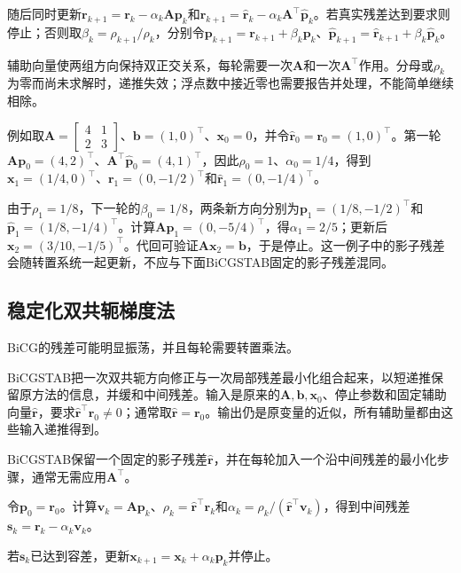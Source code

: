 随后同时更新$\bm r_{k+1}=\bm r_k-\alpha_k\bm A\bm p_k$和$\widehat{\bm r}_{k+1}=\widehat{\bm r}_k-\alpha_k\bm A^\top\widehat{\bm p}_k$。若真实残差达到要求则停止；否则取$\beta_k=\rho_{k+1}/\rho_k$，分别令$\bm p_{k+1}=\bm r_{k+1}+\beta_k\bm p_k$、$\widehat{\bm p}_{k+1}=\widehat{\bm r}_{k+1}+\beta_k\widehat{\bm p}_k$。

辅助向量使两组方向保持双正交关系，每轮需要一次$\bm A$和一次$\bm A^\top$作用。分母或$\rho_k$为零而尚未求解时，递推失效；浮点数中接近零也需要报告并处理，不能简单继续相除。

例如取$\bm A=\left[\begin{smallmatrix}4&1\\2&3\end{smallmatrix}\right]$、$\bm b=(1,0)^\top$、$\bm x_0=0$，并令$\widehat{\bm r}_0=\bm r_0=(1,0)^\top$。第一轮$\bm A\bm p_0=(4,2)^\top$、$\bm A^\top\widehat{\bm p}_0=(4,1)^\top$，因此$\rho_0=1$、$\alpha_0=1/4$，得到$\bm x_1=(1/4,0)^\top$、$\bm r_1=(0,-1/2)^\top$和$\widehat{\bm r}_1=(0,-1/4)^\top$。

由于$\rho_1=1/8$，下一轮的$\beta_0=1/8$，两条新方向分别为$\bm p_1=(1/8,-1/2)^\top$和$\widehat{\bm p}_1=(1/8,-1/4)^\top$。计算$\bm A\bm p_1=(0,-5/4)^\top$，得$\alpha_1=2/5$；更新后$\bm x_2=(3/10,-1/5)^\top$。代回可验证$\bm A\bm x_2=\bm b$，于是停止。这一例子中的影子残差会随转置系统一起更新，不应与下面BiCGSTAB固定的影子残差混同。

\subsection{稳定化双共轭梯度法}

BiCG的残差可能明显振荡，并且每轮需要转置乘法。

BiCGSTAB把一次双共轭方向修正与一次局部残差最小化组合起来，以短递推保留原方法的信息，并缓和中间残差。输入是原来的$\bm A,\bm b,\bm x_0$、停止参数和固定辅助向量$\widehat{\bm r}$，要求$\widehat{\bm r}^\top\bm r_0\ne0$；通常取$\widehat{\bm r}=\bm r_0$。输出仍是原变量的近似，所有辅助量都由这些输入递推得到。

BiCGSTAB保留一个固定的影子残差$\widehat{\bm r}$，并在每轮加入一个沿中间残差的最小化步骤，通常无需应用$\bm A^\top$。

令$\bm p_0=\bm r_0$。计算$\bm v_k=\bm A\bm p_k$、$\rho_k=\widehat{\bm r}^\top\bm r_k$和$\alpha_k=\rho_k/(\widehat{\bm r}^\top\bm v_k)$，得到中间残差$\bm s_k=\bm r_k-\alpha_k\bm v_k$。

若$\bm s_k$已达到容差，更新$\bm x_{k+1}=\bm x_k+\alpha_k\bm p_k$并停止。

